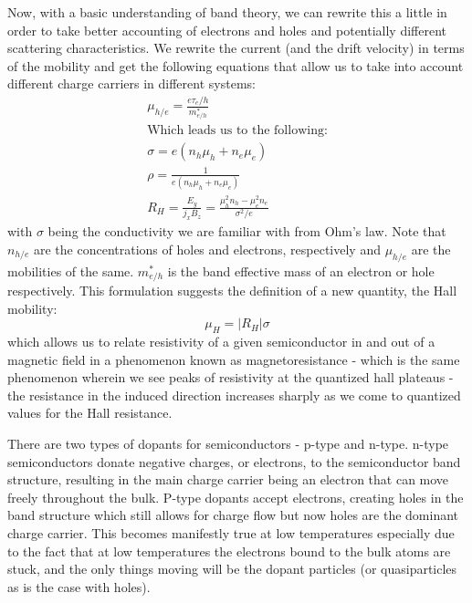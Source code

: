\documentclass[reprint, nobibnotes, amssymb, amsmath, amsfonts, physics, mathtools, mathrsfs, floatfix]{revtex4-1}
\begin{document}
    Now, with a basic understanding of band theory, we can rewrite this a little in order to take better accounting of electrons and holes and potentially different scattering characteristics.  We rewrite the current (and the drift velocity) in terms of the mobility and get the following equations that allow us to take into account different charge carriers in different systems:
    \begin{gather}
      \mu_{h/e} = \frac{e \tau_e/h}{m_{e/h}^*} \label{mobility} \\
      \text{Which leads us to the following:} \nonumber \\
      \sigma = e(n_h\mu_h + n_e\mu_e) \label{conductivity} \\
      \rho = \frac{1}{e(n_h\mu_h + n_e\mu_e)} \label{resistivity} \\
      R_H = \frac{E_y}{j_x B_z} = \frac{\mu_h^2 n_h - \mu_e^2 n_e}{\sigma^2/e} \label{rh_mob_sigma}
    \end{gather}
    with $\sigma$ being the conductivity we are familiar with from Ohm's law.  Note that $n_{h/e}$ are the concentrations of holes and electrons, respectively and $\mu_{h/e}$ are the mobilities of the same.  $m_{e/h}^*$ is the band effective mass of an electron or hole respectively.  This formulation suggests the definition of a new quantity, the Hall mobility:
    \begin{equation}
      \mu_H = |R_H|\sigma \label{hall_mobility}
    \end{equation}
    which allows us to relate resistivity of a given semiconductor in and out of a magnetic field in a phenomenon known as magnetoresistance - which is the same phenomenon wherein we see peaks of resistivity at the quantized hall plateaus - the resistance in the induced direction increases sharply as we come to quantized values for the Hall resistance.

    There are two types of dopants for semiconductors - p-type and n-type.  n-type semiconductors donate negative charges, or electrons, to the semiconductor band structure, resulting in the main charge carrier being an electron that can move freely throughout the bulk.  P-type dopants accept electrons, creating holes in the band structure which still allows for charge flow but now holes are the dominant charge carrier.  This becomes manifestly true at low temperatures especially due to the fact that at low temperatures the electrons bound to the bulk atoms are stuck, and the only things moving will be the dopant particles (or quasiparticles as is the case with holes).
\end{document}
